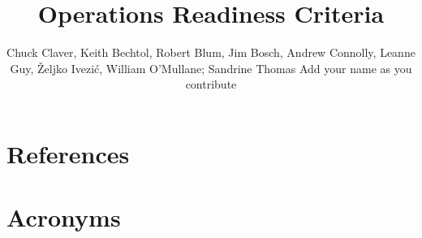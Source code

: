 \documentclass[SE,lsstdraft,authoryear,toc]{lsstdoc}
\title{Operations Readiness Criteria}
\author{%
Chuck Claver, 
Keith Bechtol, 
Robert Blum, 
Jim Bosch, 
Andrew Connolly, 
Leanne Guy,  
\v{Z}eljko Ivezi\'{c}, 
William O'Mullane; 
Sandrine Thomas
Add your name as you contribute
}
\date{\vcsDate}
\begin{document}
\maketitle














\appendix
\section{References} \label{sec:bib}
\renewcommand{\refname}{} %


\section{Acronyms} \label{sec:acronyms}

\end{document}

